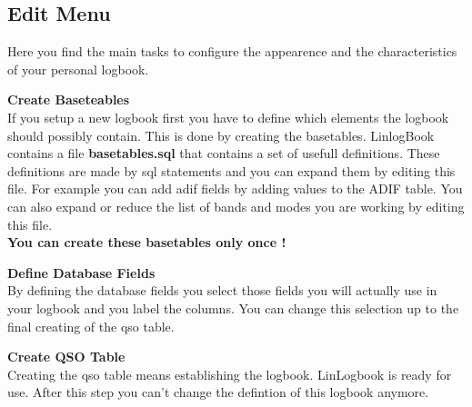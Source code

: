 \documentclass[a4paper,11pt]{article}
\begin{document}
\subsection{Edit Menu}
\begin{flushleft}
Here you find the main tasks to configure the appearence and the characteristics
of your personal logbook.\linebreak

\textbf{Create Baseteables}\\
If you setup a new logbook first you have to define which elements the logbook
should possibly contain. This is done by creating the basetables. LinlogBook
contains a file \textbf{basetables.sql} that contains a set of usefull definitions. These
definitions are made by sql statements and you can expand them by editing this
file. For example you can add adif fields by adding values to the ADIF table.
You can also expand or reduce the list of bands and modes you are working by
editing this file.\\
\textbf{You can create these basetables only once !}\linebreak

\textbf{Define Database Fields}\\
By defining the database fields you select those fields you will actually use in
your logbook and you label the columns. You can change this selection up to
the final creating of the qso table.\linebreak

\textbf{Create QSO Table}\\
Creating the qso table means establishing the logbook. LinLogbook is ready for
use. After this step you can’t change the defintion of this logbook anymore.\linebreak


\end{flushleft}
\end{document}
